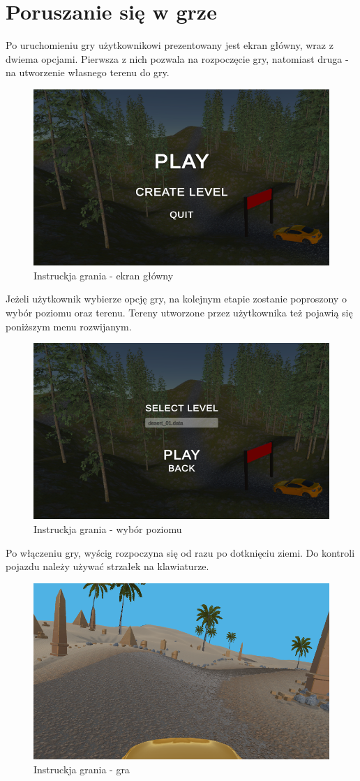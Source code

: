 \section{Poruszanie się w grze}
    Po uruchomieniu gry użytkownikowi prezentowany jest ekran główny, wraz z dwiema opcjami. Pierwsza z nich pozwala na rozpoczęcie gry, 
    natomiast druga - na utworzenie własnego terenu do gry.
    \begin{figure}[H]
        \centering
        \includegraphics[width=.7\textwidth]{figures/game_instruction_start.png}
        \caption{Instruckja grania - ekran główny}
        \label{fig}
    \end{figure}
    Jeżeli użytkownik wybierze opcję gry, na kolejnym etapie zostanie poproszony o wybór poziomu oraz terenu. 
    Tereny utworzone przez użytkownika też pojawią się poniższym menu rozwijanym.
    \begin{figure}[H]
        \centering
        \includegraphics[width=.7\textwidth]{figures/game_instruction_choose_level.png}
        \caption{Instruckja grania - wybór poziomu}
        \label{fig}
    \end{figure}
    \clearpage
    Po włączeniu gry, wyścig rozpoczyna się od razu po dotknięciu ziemi. Do kontroli pojazdu należy używać strzałek na klawiaturze.
    \begin{figure}[H]
        \centering
        \includegraphics[width=.7\textwidth]{figures/game_instruction_play.png}
        \caption{Instruckja grania - gra}
        \label{fig}
    \end{figure}
